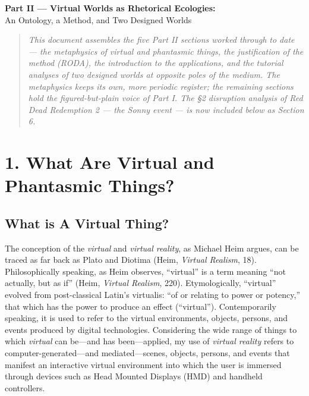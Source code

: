 \documentclass{article}
\begin{document}
\begin{center}
{\LARGE\bfseries Part II — Virtual Worlds as Rhetorical Ecologies:}\\[4pt]
{\large An Ontology, a Method, and Two Designed Worlds}
\end{center}
\vspace{1em}


\begin{quote}\small\itshape This document assembles the five Part II sections worked through to date — the metaphysics of virtual and phantasmic things, the justification of the method (RODA), the introduction to the applications, and the tutorial analyses of two designed worlds at opposite poles of the medium. The metaphysics keeps its own, more periodic register; the remaining sections hold the figured-but-plain voice of Part I. The §2 disruption analysis of Red Dead Redemption 2 --- the Sonny event --- is now included below as Section 6.\end{quote}

\bigskip

\bigskip

\section*{1. What Are Virtual and Phantasmic Things?}

\subsection*{What is A Virtual Thing?}

The conception of the \textit{virtual} and \textit{virtual reality}, as Michael Heim argues, can be traced as far back as Plato and Diotima (Heim, \textit{Virtual Realism}, 18). Philosophically speaking, as Heim observes, ``virtual'' is a term meaning ``not actually, but as if'' (Heim, \textit{Virtual Realism}, 220). Etymologically, ``virtual'' evolved from post-classical Latin’s virtualis: ``of or relating to power or potency,'' that which has the power to produce an effect (``virtual''). Contemporarily speaking, it is used to refer to the virtual environments, objects, persons, and events produced by digital technologies. Considering the wide range of things to which \textit{virtual} can be—and has been—applied, my use of \textit{virtual reality} refers to computer-generated—and mediated—scenes, objects, persons, and events that manifest an interactive virtual environment into which the user is immersed through devices such as Head Mounted Displays (HMD) and handheld controllers.
\end{document}
